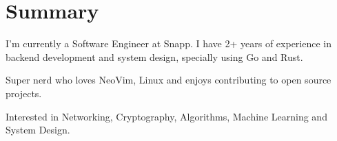 \section{Summary}\closesection{}

I'm currently a Software Engineer at Snapp. I have 2+ years of experience in backend development and system design, specially using Go and Rust.

Super nerd who loves NeoVim, Linux and enjoys contributing to open source projects.

Interested in Networking, Cryptography, Algorithms, Machine Learning and System Design.